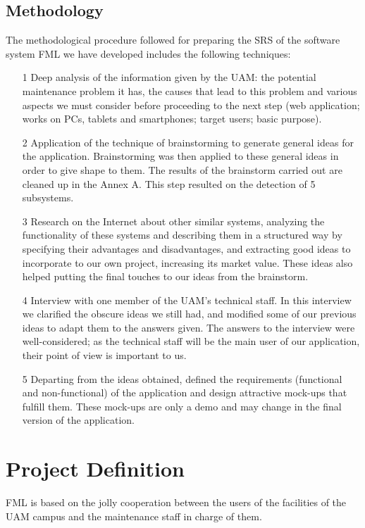 \documentclass{report}
\begin{document}
\section{Methodology}

The methodological procedure followed for preparing the SRS of the software system FML we have developed includes the following techniques:
\begin{itemize}
\item[1] Deep analysis of the information given by the UAM: the potential maintenance problem it has, the causes that lead to this problem and various aspects we must consider before proceeding to the next step (web application;  works on PCs, tablets and smartphones; target users; basic purpose).
\item[2] Application of the technique of brainstorming to generate general ideas for the application. Brainstorming was then applied to these general ideas in order to give shape to them. The results of the brainstorm carried out are cleaned up in the Annex A. This step resulted on the detection of 5 subsystems.
\item[3] Research on the Internet about other similar systems, analyzing the functionality of these systems and describing them in a structured way by specifying their advantages and disadvantages, and extracting good ideas to incorporate to our own project, increasing its market value. These ideas also helped putting the final touches to our ideas from the brainstorm.
\item[4] Interview with one member of the UAM's technical staff. In this interview we clarified the obscure ideas we still had, and modified some of our previous ideas to adapt them to the answers given. The answers to the interview were well-considered; as the technical staff will be the main user of our application, their point of view is important to us.
\item[5] Departing from the ideas obtained, defined the requirements (functional and non-functional) of the application and design attractive mock-ups that fulfill them. These mock-ups are only a demo and may change in the final version of the application.
\end{itemize}

\chapter{Project Definition}

FML is based on the jolly cooperation between the users of the facilities of the UAM campus and the maintenance staff in charge of them. 
\end{document}
